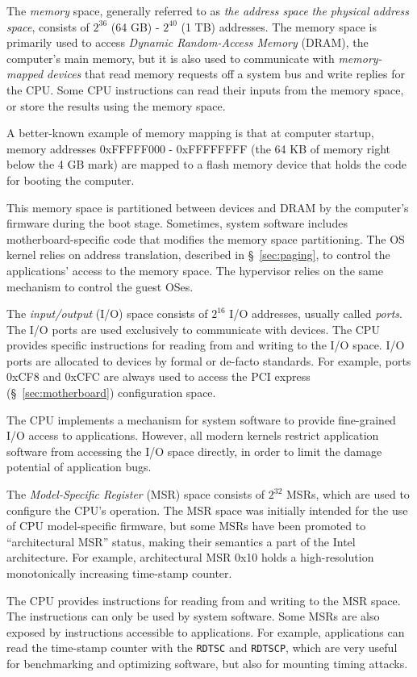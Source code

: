 The \textit{memory} space, generally referred to as \textit{the address space}
\textit{the physical address space}, consists of $2^{36}$ (64 GB) - $2^{40}$
(1 TB) addresses. The memory space is primarily used to access
\textit{Dynamic Random-Access Memory} (DRAM), the computer's main memory, but
it is also used to communicate with \textit{memory-mapped devices} that read
memory requests off a system bus and write replies for the CPU. Some CPU
instructions can read their inputs from the memory space, or store the results
using the memory space.

A better-known example of memory mapping is that at computer startup, memory
addresses 0xFFFFF000 - 0xFFFFFFFF (the 64 KB of memory right below the 4 GB
mark) are mapped to a flash memory device that holds the code for booting the
computer.

This memory space is partitioned between devices and DRAM by the computer's
firmware during the boot stage. Sometimes, system software includes
motherboard-specific code that modifies the memory space partitioning. The OS
kernel relies on address translation, described in \S~\ref{sec:paging}, to
control the applications' access to the memory space. The hypervisor relies on
the same mechanism to control the guest OSes.

The \textit{input/output} (I/O) space consists of $2^{16}$ I/O addresses,
usually called \textit{ports}. The I/O ports are used exclusively to
communicate with devices. The CPU provides specific instructions for reading
from and writing to the I/O space. I/O ports are allocated to devices by formal
or de-facto standards. For example, ports 0xCF8 and 0xCFC are always used to
access the PCI express (\S~\ref{sec:motherboard}) configuration space.

The CPU implements a mechanism for system software to provide fine-grained I/O
access to applications. However, all modern kernels restrict application
software from accessing the I/O space directly, in order to limit the damage
potential of application bugs.


The \textit{Model-Specific Register} (MSR) space consists of $2^{32}$ MSRs,
which are used to configure the CPU's operation. The MSR space was initially
intended for the use of CPU model-specific firmware, but some MSRs have been
promoted to ``architectural MSR'' status, making their semantics a part of the
Intel architecture. For example, architectural MSR 0x10 holds a high-resolution
monotonically increasing time-stamp counter.

The CPU provides instructions for reading from and writing to the MSR space.
The instructions can only be used by system software. Some MSRs are also
exposed by instructions accessible to applications. For example, applications
can read the time-stamp counter with the \texttt{RDTSC} and \texttt{RDTSCP},
which are very useful for benchmarking and optimizing software, but also for
mounting timing attacks.
